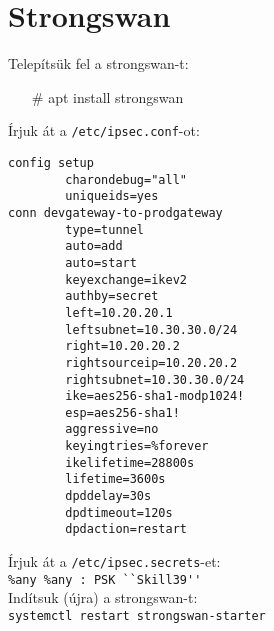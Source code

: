 \documentclass{article} %
\begin{document}
    \section*{Strongswan} %

    Telepítsük fel a strongswan-t:

    \begin{itemize}
	    \item[\#] apt install strongswan
    \end{itemize}

    Írjuk át a \lstinline|/etc/ipsec.conf|-ot:

    \begin{lstlisting}
config setup
        charondebug="all"
        uniqueids=yes
conn devgateway-to-prodgateway
        type=tunnel
        auto=add
        auto=start
        keyexchange=ikev2
        authby=secret
        left=10.20.20.1
        leftsubnet=10.30.30.0/24
        right=10.20.20.2
        rightsourceip=10.20.20.2
        rightsubnet=10.30.30.0/24
        ike=aes256-sha1-modp1024!
        esp=aes256-sha1!
        aggressive=no
        keyingtries=%forever
        ikelifetime=28800s
        lifetime=3600s
        dpddelay=30s
        dpdtimeout=120s
        dpdaction=restart
    \end{lstlisting}

    Írjuk át a \lstinline|/etc/ipsec.secrets|-et: \\
    \lstinline|%any %any : PSK ``Skill39''| \\


    Indítsuk (újra) a strongswan-t: \\
    \lstinline|systemctl restart strongswan-starter|
\end{document}
